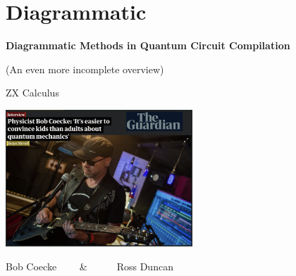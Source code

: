 \section{Diagrammatic}


\begin{frame}[noframenumbering]
	
\vfill
\centering

\vspace{-.5cm}\textbf{\Large Diagrammatic Methods in Quantum Circuit Compilation}\vspace{-.5cm}

\vfill

\centering
\alert{(An even more incomplete overview)}

\end{frame}



\begin{refframe}{ZX Calculus}

\centering
\includegraphics[width=7cm]{graphics/coecke}	

Bob Coecke ~~~~\&~~~~~~Ross Duncan~\cite{cd2011}




\end{refframe}



